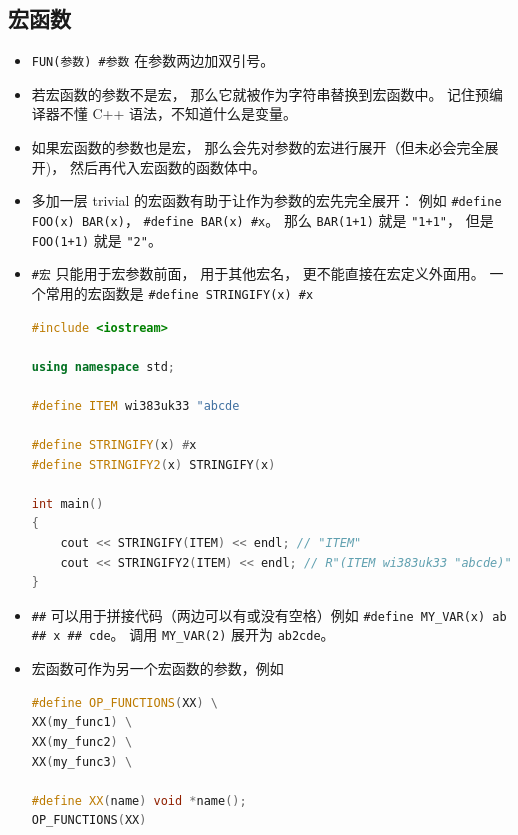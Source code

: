 \subsection{宏函数}
\begin{itemize}
\item \verb`FUN(参数) #参数` 在参数两边加双引号。
\item 若宏函数的参数不是宏， 那么它就被作为字符串替换到宏函数中。 记住预编译器不懂 C++ 语法，不知道什么是变量。
\item 如果宏函数的参数也是宏， 那么会先对参数的宏进行展开（但未必会完全展开)， 然后再代入宏函数的函数体中。
\item 多加一层 trivial 的宏函数有助于让作为参数的宏先完全展开： 例如 \verb`#define FOO(x) BAR(x)`， \verb`#define BAR(x) #x`。 那么 \verb`BAR(1+1)` 就是 \verb`"1+1"`， 但是 \verb`FOO(1+1)` 就是 \verb`"2"`。
\item \verb`#宏` 只能用于宏参数前面， 用于其他宏名， 更不能直接在宏定义外面用。 一个常用的宏函数是 \verb`#define STRINGIFY(x) #x`
\begin{lstlisting}[language=cpp]
#include <iostream>

using namespace std;

#define ITEM wi383uk33 "abcde

#define STRINGIFY(x) #x
#define STRINGIFY2(x) STRINGIFY(x)

int main()
{
	cout << STRINGIFY(ITEM) << endl; // "ITEM"
	cout << STRINGIFY2(ITEM) << endl; // R"(ITEM wi383uk33 "abcde)"
}
\end{lstlisting}
\item \verb`##` 可以用于拼接代码（两边可以有或没有空格）例如 \verb`#define MY_VAR(x) ab ## x ## cde`。 调用 \verb`MY_VAR(2)` 展开为 \verb`ab2cde`。
\item 宏函数可作为另一个宏函数的参数，例如
\begin{lstlisting}[language=cpp]
#define OP_FUNCTIONS(XX) \
XX(my_func1) \
XX(my_func2) \
XX(my_func3) \

#define XX(name) void *name();
OP_FUNCTIONS(XX)
\end{lstlisting}
\end{itemize}
